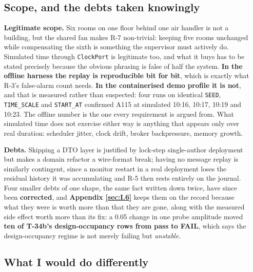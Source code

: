 \subsection{Scope, and the debts taken knowingly}\label{sec:13.9}

\textbf{Legitimate scope.} Six rooms on one floor behind one air handler is not a building, but the
shared fan makes R-7 non-trivial: keeping five rooms unchanged while compensating the sixth is
something the supervisor must actively do. Simulated time through \texttt{ClockPort} is legitimate
too, and what it buys has to be stated precisely because the obvious phrasing is false of half the
system. \textbf{In the offline harness the replay is reproducible bit for bit}, which is exactly what
R-3's false-alarm count needs. \textbf{In the containerised demo profile it is not}, and that is
measured rather than suspected: four runs on identical \texttt{SEED}, \texttt{TIME\_SCALE} and
\texttt{START\_AT} confirmed A115 at simulated 10:16, 10:17, 10:19 and 10:23. The offline number is
the one every requirement is argued from. What simulated time does not exercise either way is
anything that appears only over real duration: scheduler jitter, clock drift, broker backpressure,
memory growth.

\textbf{Debts.} Skipping a DTO layer is justified by lock-step single-author deployment but makes a
domain refactor a wire-format break; having no message replay is similarly contingent, since a monitor
restart in a real deployment loses the residual history it was accumulating and R-5 then rests
entirely on the journal. Four smaller debts of one shape, the same fact written down twice, have
since been \textbf{corrected}, and \textbf{Appendix \ref{sec:I.6}} keeps them on the record because what they
were is worth more than that they are gone, along with the measured side effect worth more than its
fix: a 0.05 change in one probe amplitude moved \textbf{ten of T-34b's design-occupancy rows from
pass to FAIL}, which says the design-occupancy regime is not merely failing but \emph{unstable}.

\subsection{What I would do differently}\label{sec:13.10}

